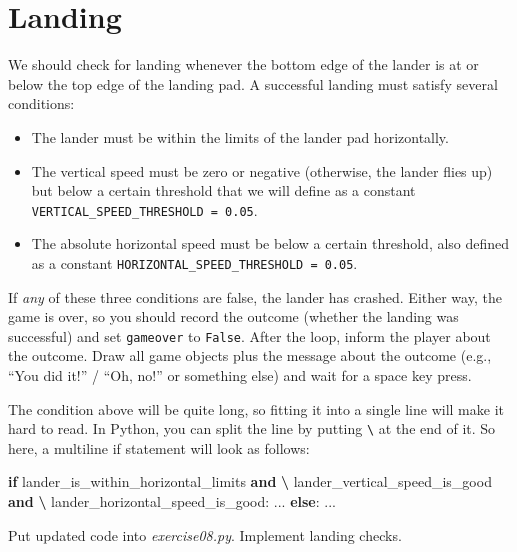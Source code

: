\documentclass[
]{book}
\newenvironment{Shaded}{\begin{snugshade}}{\end{snugshade}}
\newcommand{\ControlFlowTok}[1]{\textcolor[rgb]{0.13,0.29,0.53}{\textbf{#1}}}
\newcommand{\KeywordTok}[1]{\textcolor[rgb]{0.13,0.29,0.53}{\textbf{#1}}}
\newcommand{\NormalTok}[1]{#1}
\newcommand{\OperatorTok}[1]{\textcolor[rgb]{0.81,0.36,0.00}{\textbf{#1}}}
\providecommand{\tightlist}{%
  \setlength{\itemsep}{0pt}\setlength{\parskip}{0pt}}
\begin{document}
\hypertarget{landing}{%
\section{Landing}\label{landing}}

We should check for landing whenever the bottom edge of the lander is at or below the top edge of the landing pad. A successful landing must satisfy several conditions:

\begin{itemize}
\tightlist
\item
  The lander must be within the limits of the lander pad horizontally.
\item
  The vertical speed must be zero or negative (otherwise, the lander flies up) but below a certain threshold that we will define as a constant \texttt{VERTICAL\_SPEED\_THRESHOLD\ =\ 0.05}.
\item
  The absolute horizontal speed must be below a certain threshold, also defined as a constant \texttt{HORIZONTAL\_SPEED\_THRESHOLD\ =\ 0.05}.
\end{itemize}

If \emph{any} of these three conditions are false, the lander has crashed. Either way, the game is over, so you should record the outcome (whether the landing was successful) and set \texttt{gameover} to \texttt{False}. After the loop, inform the player about the outcome. Draw all game objects plus the message about the outcome (e.g., ``You did it!'' / ``Oh, no!'' or something else) and wait for a space key press.

The condition above will be quite long, so fitting it into a single line will make it hard to read. In Python, you can split the line by putting \texttt{\textbackslash{}} at the end of it. So here, a multiline if statement will look as follows:

\begin{Shaded}
\begin{Highlighting}[]
\ControlFlowTok{if}\NormalTok{ lander\_is\_within\_horizontal\_limits }\KeywordTok{and} \OperatorTok{\textbackslash{}}
\NormalTok{   lander\_vertical\_speed\_is\_good }\KeywordTok{and} \OperatorTok{\textbackslash{}}
\NormalTok{   lander\_horizontal\_speed\_is\_good:}
\NormalTok{   ...}
\ControlFlowTok{else}\NormalTok{:}
\NormalTok{  ...}
\end{Highlighting}
\end{Shaded}

Put updated code into \emph{exercise08.py}. Implement landing checks.
\end{document}
